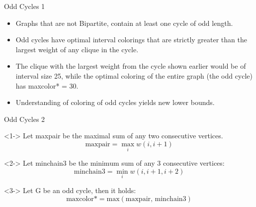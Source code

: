 \begin{frame}{Odd Cycles 1}
  \begin{itemize}
    \item<1-> Graphs that are not Bipartite, contain at least one cycle of odd length.
    \null
    \item<2-> Odd cycles have optimal interval colorings that are strictly greater than the largest weight of
    any clique in the cycle.
    \null
    \item<3-> The clique with the largest weight from the cycle shown earlier would be of interval size 25, while the
    optimal coloring of the entire graph (the odd cycle) has maxcolor* = 30.
    \null
    \item<4-> Understanding of coloring of odd cycles yields new lower bounds.
  \end{itemize}
\end{frame}

\begin{frame}{Odd Cycles 2}
  
  \begin{definition}<1->
    Let maxpair be the maximal sum of any two consecutive vertices. \footnotemark
    \[ \text{maxpair} = \max_i w(i, i + 1) \]
  \end{definition}

  \begin{definition}<2->
    Let minchain3 be the minimum sum of any 3 consecutive vertices:
    \[ \text{minchain3} = \min_i w(i, i + 1, i+2) \]
  \end{definition}

  \begin{theorem}<3->
    Let G be an odd cycle, then it holds:
    \[ \text{maxcolor*} = \text{max}(\text{maxpair, minchain3}) \]
  \end{theorem}

\end{frame}

